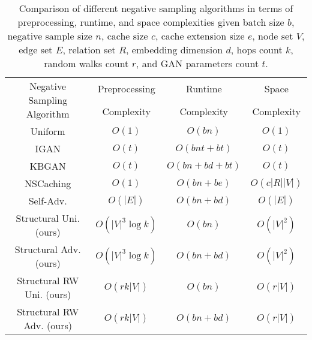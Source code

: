 \begin{table}[!htbp]
    \centering
    \begin{tabular}{cccc}
    \hline
         \multirow{2}{3cm}{\centering Negative Sampling Algorithm} & Preprocessing  & Runtime  & Space \\
         & Complexity & Complexity & Complexity
         \\
         \hline
         Uniform \cite{bordes2013translating} & $O(1)$ & $O(bn)$ & $O(1)$ \\
         IGAN \cite{yu2014improving} & $O(t)$ & $O(bnt + bt)$ & $O(t)$ \\
         KBGAN \cite{cai2017kbgan} & $O(t)$ & $O(bn + bd + bt)$ & $O(t)$ \\
         NSCaching \cite{zhang2019nscaching} & $O(1)$ & $O(bn + be)$ & $O(c|R||V|)$ \\
         Self-Adv. \cite{sun2019rotate} & $O(|E|)$ & $O(bn + bd)$ & $O(|E|)$ \\
         Structural Uni. (ours) & $O(|V|^3\log k)$ & $O(bn)$ & $O(|V|^2)$ \\
         Structural Adv. (ours) & $O(|V|^3\log k)$ & $O(bn + bd)$ & $O(|V|^2)$ \\
         Structural RW Uni. (ours) & $O(rk|V|)$ & $O(bn)$ & $O(r|V|)$ \\
         Structural RW Adv. (ours) & $O(rk|V|)$ & $O(bn + bd)$ & $O(r|V|)$ \\
         \hline
    \end{tabular}
    \caption{Comparison of different negative sampling algorithms in terms of preprocessing, runtime, and space complexities given batch size $b$, negative sample size $n$, cache size $c$, cache extension size $e$, node set $V$, edge set $E$, relation set $R$, embedding dimension $d$, hops count $k$, random walks count $r$, and GAN parameters count $t$.}
    \label{tab:times}
\end{table}
